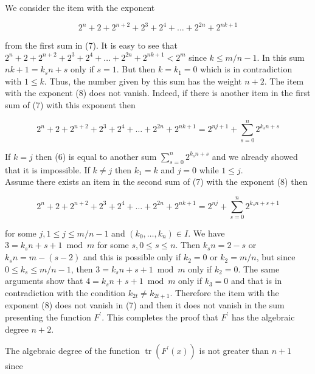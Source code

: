 \documentclass[10pt]{article}
\begin{document}
We consider the item with the exponent


\begin{equation*}
2^{n}+2+2^{n+2}+2^{3}+2^{4}+\ldots+2^{2 n}+2^{n k+1} \tag{8}
\end{equation*}


from the first sum in (7). It is easy to see that $2^{n}+2+2^{n+2}+2^{3}+2^{4}+\ldots+2^{2 n}+2^{n k+1}<2^{m}$ since $k \leq m / n-1$. In this sum $n k+1=k_{s} n+s$ only if $s=1$. But then $k=k_{1}=0$ which is in contradiction with $1 \leq k$. Thus, the number given by this sum has the weight $n+2$. The item with the exponent (8) does not vanish. Indeed, if there is another item in the first sum of (7) with this exponent then

$$
2^{n}+2+2^{n+2}+2^{3}+2^{4}+\ldots+2^{2 n}+2^{n k+1}=2^{n j+1}+\sum_{s=0}^{n} 2^{k_{s} n+s}
$$

If $k=j$ then (6) is equal to another sum $\sum_{s=0}^{n} 2^{k_{s} n+s}$ and we already showed that it is impossible. If $k \neq j$ then $k_{1}=k$ and $j=0$ while $1 \leq j$.\\
Assume there exists an item in the second sum of (7) with the exponent (8) then

$$
2^{n}+2+2^{n+2}+2^{3}+2^{4}+\ldots+2^{2 n}+2^{n k+1}=2^{n j}+\sum_{s=0}^{n} 2^{k_{s} n+s+1}
$$

for some $j, 1 \leq j \leq m / n-1$ and $\left(k_{0}, \ldots, k_{n}\right) \in I$. We have $3=k_{s} n+s+1 \bmod m$ for some $s, 0 \leq s \leq n$. Then $k_{s} n=2-s$ or $k_{s} n=m-(s-2)$ and this is possible only if $k_{2}=0$ or $k_{2}=m / n$, but since $0 \leq k_{s} \leq m / n-1$, then $3=k_{s} n+s+1 \bmod m$ only if $k_{2}=0$. The same arguments show that $4=k_{s} n+s+1 \bmod m$ only if $k_{3}=0$ and that is in contradiction with the condition $k_{2 t} \neq k_{2 t+1}$. Therefore the item with the exponent (8) does not vanish in (7) and then it does not vanish in the sum presenting the function $F^{\prime}$. This completes the proof that $F^{\prime}$ has the algebraic degree $n+2$.

The algebraic degree of the function $\operatorname{tr}\left(F^{\prime}(x)\right)$ is not greater than $n+1$ since
\end{document}
